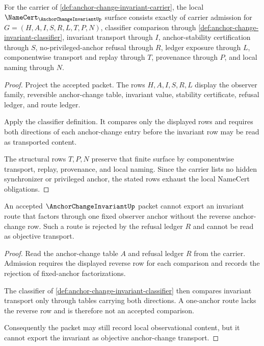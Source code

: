 \begin{theorem}
\label{thm:anchor-change-invariant-namecert-obligations}
For the carrier of \autoref{def:anchor-change-invariant-carrier}, the local $\NameCert_{\AnchorChangeInvariantUp}$ surface consists exactly of carrier admission for $G=(H,A,I,S,R,L,T,P,N)$, classifier comparison through \autoref{def:anchor-change-invariant-classifier}, invariant transport through $I$, anchor-stability certification through $S$, no-privileged-anchor refusal through $R$, ledger exposure through $L$, componentwise transport and replay through $T$, provenance through $P$, and local naming through $N$.
\end{theorem}
\begin{proof}
Project the accepted packet. The rows $H,A,I,S,R,L$ display the observer family, reversible anchor-change table, invariant value, stability certificate, refusal ledger, and route ledger.

Apply the classifier definition. It compares only the displayed rows and requires both directions of each anchor-change entry before the invariant row may be read as transported content.

The structural rows $T,P,N$ preserve that finite surface by componentwise transport, replay, provenance, and local naming. Since the carrier lists no hidden synchronizer or privileged anchor, the stated rows exhaust the local NameCert obligations.
\end{proof}

\begin{theorem}
\label{thm:anchor-change-invariant-no-privileged-anchor}
An accepted $\AnchorChangeInvariantUp$ packet cannot export an invariant route that factors through one fixed observer anchor without the reverse anchor-change row. Such a route is rejected by the refusal ledger $R$ and cannot be read as objective transport.
\end{theorem}
\begin{proof}
Read the anchor-change table $A$ and refusal ledger $R$ from the carrier. Admission requires the displayed reverse row for each comparison and records the rejection of fixed-anchor factorizations.

The classifier of \autoref{def:anchor-change-invariant-classifier} then compares invariant transport only through tables carrying both directions. A one-anchor route lacks the reverse row and is therefore not an accepted comparison.

Consequently the packet may still record local observational content, but it cannot export the invariant as objective anchor-change transport.
\end{proof}

